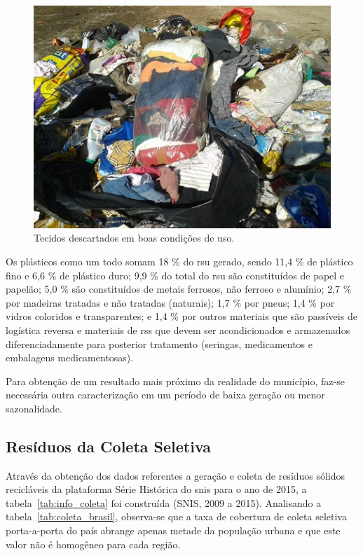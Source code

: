 	
\begin{figure}
	\centering
	\includegraphics[width=0.7\linewidth]{produtos/prodtres/image040}
	\caption{Tecidos descartados em boas condições de uso.}
	\label{fig:image040}
\end{figure}

	Os plásticos como um todo somam 18 \% do \gls{rsu} gerado, sendo 11,4 \% de plástico fino e 6,6 \% de plástico duro; 9,9 \% do total do \gls{rsu} são constituídos de papel e papelão; 5,0 \% são constituídos de metais ferrosos, não ferroso e alumínio; 2,7 \% por madeiras tratadas e não tratadas (naturais); 1,7 \% por pneus; 1,4 \% por vidros coloridos e transparentes; e 1,4 \% por outros materiais que são passíveis de logística reversa e  materiais de \gls{rss} que devem ser acondicionados e armazenados diferenciadamente para posterior tratamento (seringas, medicamentos e embalagens medicamentosas).
	
	Para obtenção de um resultado mais próximo da realidade do município, faz-se necessária outra caracterização em um período de baixa geração ou menor sazonalidade.
	
	\subsection{Resíduos da Coleta Seletiva}
	\label{subsec:res_coleta_seletiva}
	
	Através da obtenção dos dados referentes a geração e coleta de resíduos sólidos recicláveis da plataforma Série Histórica do \gls{snis} para o ano de 2015, a tabela~\ref{tab:info_coleta} foi construída (SNIS, 2009 a 2015). Analisando a tabela~\ref{tab:coleta_brasil}, observa-se que a taxa de cobertura de coleta seletiva porta-a-porta do país abrange apenas metade da população urbana e que este valor não é homogêneo para cada região.
	
